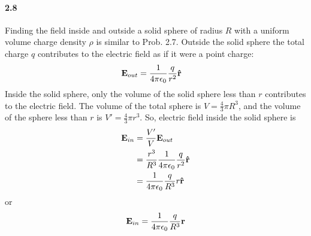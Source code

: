 \documentclass[../main.tex]{subfiles}
\begin{document}
\paragraph{2.8}
Finding the field inside and outside a solid sphere of radius $R$ with a uniform volume charge
density $\rho$ is similar to Prob. 2.7. Outside the solid sphere the total charge $q$ contributes
to the electric field as if it were a point charge:
\begin{align*}
    \vb{E}_{out} &= \frac{1}{4\pi\epsilon_0} \frac{q}{r^2} \vu{r}
\end{align*}
Inside the solid sphere, only the volume of the solid sphere less than $r$ contributes to the
electric field. The volume of the total sphere is $V = \frac{4}{3}\pi R^3$, and the volume of the
sphere less than $r$ is $V' = \frac{4}{3}\pi r^3$. So, electric field inside the solid sphere is
\begin{align*}
    \vb{E}_{in} &= \frac{V'}{V} \vb{E}_{out} \\
    &= \frac{r^3}{R^3} \frac{1}{4\pi\epsilon_0} \frac{q}{r^2} \vu{r} \\
    &= \frac{1}{4\pi\epsilon_0} \frac{q}{R^3} r \vu{r}
\end{align*}
or
\begin{align*}
    \vb{E}_{in} = \frac{1}{4\pi\epsilon_0} \frac{q}{R^3} \vb{r}
\end{align*}
\end{document}
